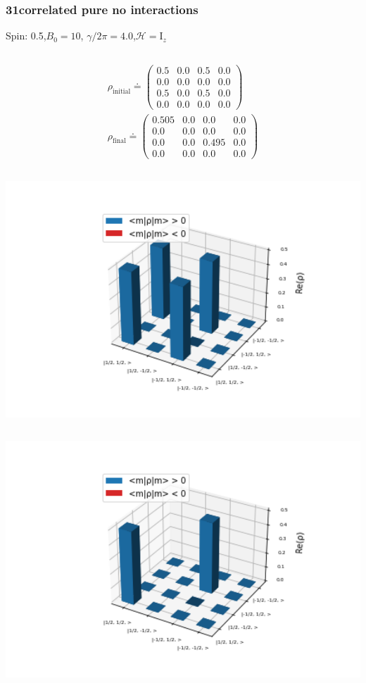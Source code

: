 \documentclass[10pt]{beamer}
\begin{document}
\begin{frame}
\frametitle{31correlated pure no interactions}
Spin: 0.5,$B_0= 10$, $\gamma/2\pi = 4.0$,$\mathcal{H}=\text{I}_{z}$
\begin{columns}[T]
\begin{column}{.5\textwidth}
\begin{align*}
\rho_{\text{initial}}\doteq
\begin{pmatrix}
0.5 & 0.0 & 0.5 & 0.0 \\
0.0 & 0.0 & 0.0 & 0.0 \\
0.5 & 0.0 & 0.5 & 0.0 \\
0.0 & 0.0 & 0.0 & 0.0
\end{pmatrix}
\\
\rho_{\text{final}}\doteq
\begin{pmatrix}
0.505 & 0.0 & 0.0 & 0.0 \\
0.0 & 0.0 & 0.0 & 0.0 \\
0.0 & 0.0 & 0.495 & 0.0 \\
0.0 & 0.0 & 0.0 & 0.0
\end{pmatrix}
\end{align*}
\begin{column}{.5\textwidth}
\includegraphics[width=1.5\textwidth]{./spin1-2/31correlated_pure_no_interactions/InitialRealPartDensityMatrix.png}
\end{column}
\begin{column}{.5\textwidth}
\includegraphics[width=1.5\textwidth]{./spin1-2/31correlated_pure_no_interactions/EvolvedRealPartDensityMatrix.png}

\end{column}
\end{column}
\end{columns}
\end{frame}
\end{document}

